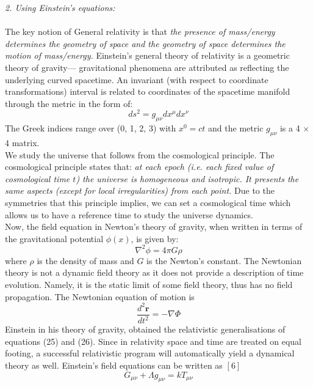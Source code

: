 \documentclass[14pt]{extarticle}
\begin{document}
\textit{2. Using Einstein's equations:} \\ \\
The key notion of General relativity is that \textit{the presence of mass/energy determines the geometry of space and the geometry of space determines the motion of mass/energy.} Einstein’s general theory of relativity is a geometric theory of gravity— gravitational phenomena are attributed as reflecting the underlying curved spacetime. An invariant (with respect to coordinate transformations) interval is related to coordinates of the spacetime manifold through the metric in the form of:\\
\begin{equation}
d s^{2}=g_{\mu \nu} d x^{\mu} d x^{\nu}
\end{equation}
The Greek indices range over (0, 1, 2, 3) with $x^{0} = ct$ and the metric  $g_{\mu \nu}$ is a 4 $\times$ 4 matrix.\\
 We study the universe that follows from the cosmological principle. The cosmological principle states that: \textit{at each epoch (i.e. each fixed value of cosmological time $t$) the universe is homogeneous and isotropic. It presents the same aspects (except for local irregularities) from each point.} Due  to  the  symmetries that this principle implies, we can set a cosmological time  which allows us to have a reference time to study the universe dynamics.\\
Now, the field equation in Newton’s theory of gravity, when written in terms of the gravitational potential $\phi(x)$, is given by:\\
\begin{equation}
\nabla^{2} \phi=4 \pi G \rho
\end{equation}
where $\rho$ is the density of mass and $G$ is the Newton's constant. The
Newtonian theory is not a dynamic field theory as it does not provide a description of time evolution. Namely, it is the static limit of some field theory, thus has no field propagation. The Newtonian equation of motion is \\
\begin{equation}
\frac{d^{2} \mathbf{r}}{d t^{2}}=-\nabla \Phi
\end{equation}
Einstein in his theory of gravity, obtained the relativistic generalisations of equations (25) and (26). Since in relativity space and time are treated on equal footing, a successful relativistic program will automatically yield a dynamical theory as well. Einstein's field equations can be written as $[6]$
\begin{equation}
G_{\mu \nu}+\Lambda g_{\mu \nu}=k T_{\mu \nu}
\end{equation}
\end{document}
